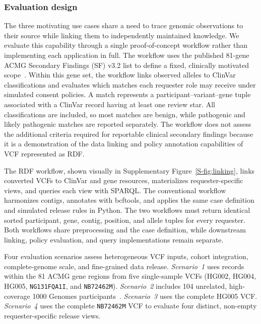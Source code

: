 \documentclass[pdflatex,sn-mathphys-num]{sn-jnl}
\begin{document}
\subsubsection{Evaluation design}\label{subsec:eval-workflow}
The three motivating use cases share a need to trace genomic observations to their source while linking them to independently maintained knowledge.
We evaluate this capability through a single proof-of-concept workflow rather than implementing each application in full.
The workflow uses the published 81-gene ACMG Secondary Findings (SF) v3.2 list to define a fixed, clinically motivated scope~\cite{miller2023acmg}.
Within this gene set, the workflow links observed alleles to ClinVar classifications and evaluates which matches each requester role may receive under simulated consent policies.
A match represents a participant--variant--gene tuple associated with a ClinVar record having at least one review star.
All classifications are included, so most matches are benign, while pathogenic and likely pathogenic matches are reported separately.
The workflow does not assess the additional criteria required for reportable clinical secondary findings because it is a demonstration of the data linking and policy annotation capabilities of VCF represented as RDF.

The RDF workflow, shown visually in Supplementary Figure~\ref{S-fig:linking}, links converted VCFs to ClinVar and gene resources, materializes requester-specific views, and queries each view with SPARQL.
The conventional workflow harmonizes contigs, annotates with bcftools, and applies the same case definition and simulated release rules in Python.
The two workflows must return identical sorted participant, gene, contig, position, and allele tuples for every requester.
Both workflows share preprocessing and the case definition, while downstream linking, policy evaluation, and query implementations remain separate.

Four evaluation scenarios assess heterogeneous VCF inputs, cohort integration, complete-genome scale, and fine-grained data release.
\emph{Scenario~1} uses records within the 81 ACMG gene regions from five single-sample VCFs (HG002, HG004, HG005, \texttt{NG131FQA1I}, and \texttt{NB72462M}).
\emph{Scenario~2} includes 104 unrelated, high-coverage 1000 Genomes participants~\cite{byrska2022highcoverage}.
\emph{Scenario~3} uses the complete HG005 VCF.
\emph{Scenario~4} uses the complete \texttt{NB72462M} VCF to evaluate four distinct, non-empty requester-specific release views.
\end{document}
